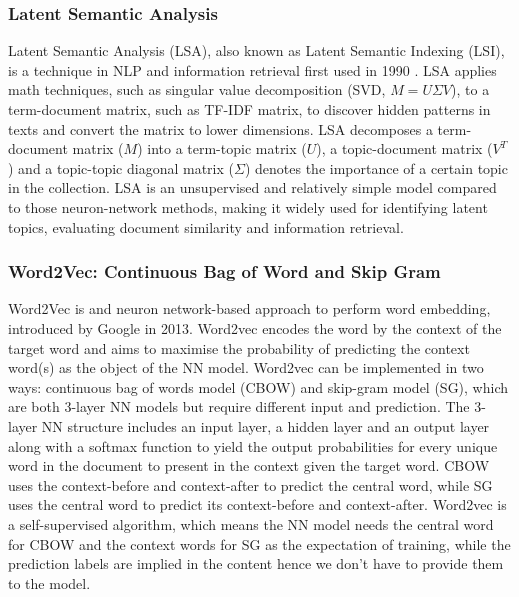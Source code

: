 \subsubsection{Latent Semantic Analysis}
Latent Semantic Analysis (LSA), also known as Latent Semantic Indexing (LSI), is a technique in NLP and information retrieval first used in 1990 \cite{deerwester1990}.
LSA applies math techniques, such as singular value decomposition (SVD, $M=U \Sigma V$), to a term-document matrix, such as TF-IDF matrix, to discover hidden patterns in texts and convert the matrix to lower dimensions.
LSA decomposes a term-document matrix ($M$) into a term-topic matrix ($U$), a topic-document matrix ($V^T$) and a topic-topic diagonal matrix ($\Sigma$) denotes the importance of a certain topic in the collection.
LSA is an unsupervised and relatively simple model compared to those neuron-network methods, making it widely used for identifying latent topics, evaluating document similarity and information retrieval.

\subsubsection{Word2Vec: Continuous Bag of Word and Skip Gram}
Word2Vec is and neuron network-based approach to perform word embedding, introduced by Google in 2013\cite{mikolov2013efficient}\cite{mikolov2013distributed}.
Word2vec encodes the word by the context of the target word and aims to maximise the probability of predicting the context word(s) as the object of the NN model.
Word2vec can be implemented in two ways: continuous bag of words model (CBOW) and skip-gram model (SG), which are both 3-layer NN models but require different input and prediction.
The 3-layer NN structure includes an input layer, a hidden layer and an output layer along with a softmax function to yield the output probabilities for every unique word in the document to present in the context given the target word.
CBOW uses the context-before and context-after to predict the central word, while SG uses the central word to predict its context-before and context-after.
Word2vec is a self-supervised algorithm, which means the NN model needs the central word for CBOW and the context words for SG as the expectation of training, while the prediction labels are implied in the content hence we don't have to provide them to the model.

